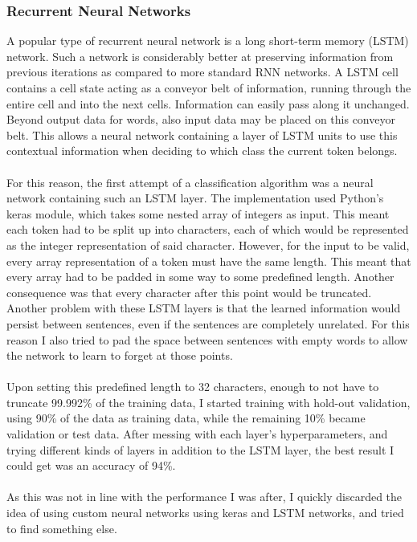 \documentclass[a4paper, 9pt]{extarticle}
\begin{document}
\subsubsection{Recurrent Neural Networks}
A popular type of recurrent neural network is a long short-term memory (LSTM) network. Such a network is considerably better at preserving information from previous iterations as compared to more standard RNN networks. A LSTM cell contains a cell state acting as a conveyor belt of information, running through the entire cell and into the next cells. Information can easily pass along it unchanged. Beyond output data for words, also input data may be placed on this conveyor belt. This allows a neural network containing a layer of LSTM units to use this contextual information when deciding to which class the current token belongs.\\
\\
For this reason, the first attempt of a classification algorithm was a neural network containing such an LSTM layer. The implementation used Python's keras module, which takes some nested array of integers as input. This meant each token had to be split up into characters, each of which would be represented as the integer representation of said character. However, for the input to be valid, every array representation of a token must have the same length. This meant that every array had to be padded in some way to some predefined length. Another consequence was that every character after this point would be truncated.\\
Another problem with these LSTM layers is that the learned information would persist between sentences, even if the sentences are completely unrelated. For this reason I also tried to pad the space between sentences with empty words to allow the network to learn to forget at those points.\\
\\
Upon setting this predefined length to 32 characters, enough to not have to truncate 99.992\% of the training data, I started training with hold-out validation, using 90\% of the data as training data, while the remaining 10\% became validation or test data. After messing with each layer's hyperparameters, and trying different kinds of layers in addition to the LSTM layer, the best result I could get was an accuracy of 94\%. \\
\\
As this was not in line with the performance I was after, I quickly discarded the idea of using custom neural networks using keras and LSTM networks, and tried to find something else.
\end{document}
